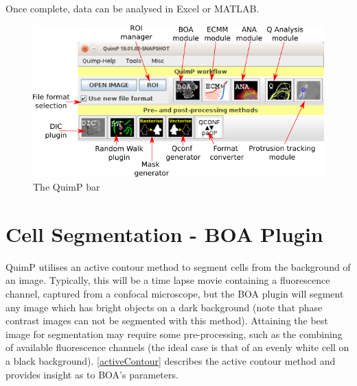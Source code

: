 \documentclass[a4paper,12pt]{article}
\begin{document}
Once complete, data can be analysed in Excel or MATLAB.

\begin{figure}[ht]
   \centering
   \includegraphics[width=15cm]{quimpBar.png} %
   \caption{The QuimP bar}
   \label{fig:quimpBar}
\end{figure}


\section{Cell Segmentation - BOA Plugin}
\label{sec:BOAPlugin}
QuimP utilises an active contour method to segment cells from the background of an image.  Typically, this will be a 
time lapse movie containing a fluorescence channel, captured from a confocal microscope, but the BOA plugin will 
segment any image which has bright objects on a dark background (note that phase contrast images can not be 
segmented with this method).  Attaining the best image for segmentation may require some pre-processing, such 
as the combining of available fluorescence channels (the ideal case is that of an evenly white cell on a black 
background).  \autoref{activeContour} describes the active contour method and provides insight as to BOA's 
parameters.
\\\\
\noindent{}
\end{document}
